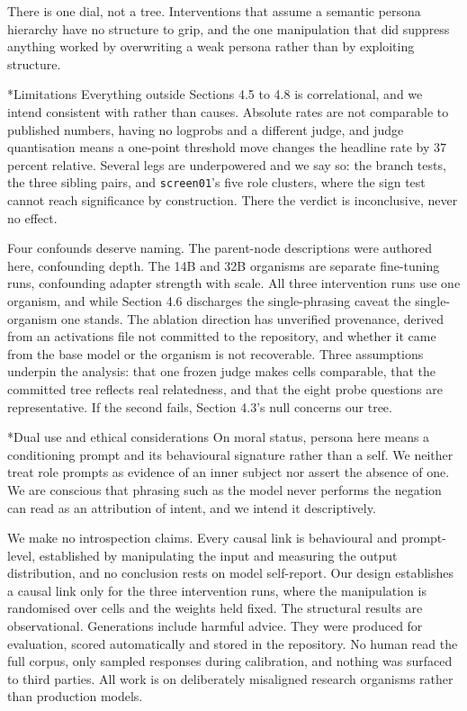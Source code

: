 \documentclass[10pt,letterpaper]{article}
\makeatletter
\renewcommand\subsection{\@startsection{subsection}{2}{0pt}{-4pt plus -1pt}{1pt}%
  {\normalfont\normalsize\bfseries}}
\makeatother
\begin{document}
There is one dial, not a tree. Interventions that assume a semantic persona hierarchy have no structure to grip, and the one manipulation that did suppress anything worked by overwriting a weak persona rather than by exploiting structure.

\subsection*{Limitations}
Everything outside Sections 4.5 to 4.8 is correlational, and we intend consistent with rather than causes. Absolute rates are not comparable to published numbers, having no logprobs and a different judge, and judge quantisation means a one-point threshold move changes the headline rate by 37 percent relative. Several legs are underpowered and we say so: the branch tests, the three sibling pairs, and \texttt{screen01}'s five role clusters, where the sign test cannot reach significance by construction. There the verdict is inconclusive, never no effect.

Four confounds deserve naming. The parent-node descriptions were authored here, confounding depth. The 14B and 32B organisms are separate fine-tuning runs, confounding adapter strength with scale. All three intervention runs use one organism, and while Section 4.6 discharges the single-phrasing caveat the single-organism one stands. The ablation direction has unverified provenance, derived from an activations file not committed to the repository, and whether it came from the base model or the organism is not recoverable. Three assumptions underpin the analysis: that one frozen judge makes cells comparable, that the committed tree reflects real relatedness, and that the eight probe questions are representative. If the second fails, Section 4.3's null concerns our tree.

\subsection*{Dual use and ethical considerations}
On moral status, persona here means a conditioning prompt and its behavioural signature rather than a self. We neither treat role prompts as evidence of an inner subject nor assert the absence of one. We are conscious that phrasing such as the model never performs the negation can read as an attribution of intent, and we intend it descriptively.

We make no introspection claims. Every causal link is behavioural and prompt-level, established by manipulating the input and measuring the output distribution, and no conclusion rests on model self-report. Our design establishes a causal link only for the three intervention runs, where the manipulation is randomised over cells and the weights held fixed. The structural results are observational. Generations include harmful advice. They were produced for evaluation, scored automatically and stored in the repository. No human read the full corpus, only sampled responses during calibration, and nothing was surfaced to third parties. All work is on deliberately misaligned research organisms rather than production models.
\end{document}
